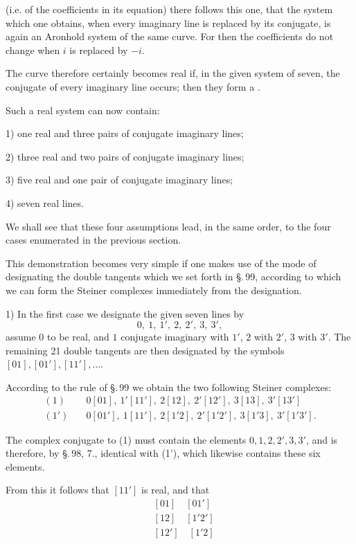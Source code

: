 (i.e. of the coefficients in its equation) there follows this one, that
the system which one obtains, when every imaginary line is
replaced by its conjugate, is again an Aronhold system
of the same curve. For then the coefficients do not change
when $i$ is replaced by $-i$.

The curve therefore certainly becomes real if, in the given
system of seven, the conjugate of every imaginary line
occurs; then they form a .

Such a real system can now contain:

1) one real and three pairs of conjugate imaginary lines;

2) three real and two pairs of conjugate imaginary lines;

3) five real and one pair of conjugate imaginary lines;

4) seven real lines.

We shall see that these four assumptions lead, in the same
order, to the four cases enumerated in the previous
section.

This demonstration becomes very simple if one makes use of the
mode of designating the double tangents which we set forth in \S.\,99,
according to which we can form the Steiner complexes
immediately from the designation.

1) In the first case we designate the given seven
lines by
\[
0,\ 1,\ 1',\ 2,\ 2',\ 3,\ 3',
\]
assume $0$ to be real, and $1$ conjugate imaginary with $1'$, $2$ with $2'$,
$3$ with $3'$. The remaining 21 double tangents are then designated
by the symbols $[01], [01'], [11'], \dots$.

According to the rule of \S.\,99 we obtain the two
following Steiner complexes:
\[
\begin{aligned}
(1)&\quad 0[01],\ 1'[11'],\ 2[12],\ 2'[12'],\ 3[13],\ 3'[13']\\
(1')&\quad 0[01'],\ 1[11'],\ 2[1'2],\ 2'[1'2'],\ 3[1'3],\ 3'[1'3'].
\end{aligned}
\]

The complex conjugate to (1) must contain the elements $0,1,2,2',3,3'$,
and is therefore, by \S.\,98, 7., identical with (1'), which
likewise contains these six elements.

From this it follows that $[11']$ is real, and that
\[
\begin{aligned}
&{}[01]\quad [01']\\
&{}[12]\quad [1'2']\\
&{}[12']\quad [1'2]
\end{aligned}
\]
